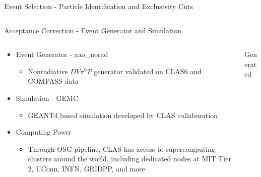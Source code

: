 \documentclass[aspectratio=169]{beamer}
\begin{document}
\begin{frame}{Event Selection - Particle Identification and Exclusivity Cuts}
\begin{columns}[c]
\begin{column}{0.65\textwidth}
\begin{columns}[t, onlytextwidth]
                	


        \end{columns}
        \end{column}   
        \end{columns}
\end{frame}


\begin{frame}{Acceptance Correction - Event Generator and Simulation}
     \begin{columns}[c]
               \begin{column}{0.5\textwidth}

                    \begin{itemize}
                        \item Event Generator - aao\_norad
                            \begin{itemize}
                                \item Nonradiative $DV\pi^0P$ generator validated on CLAS6 and COMPASS data
                            \end{itemize}
                        \item Simulation - GEMC
                            \begin{itemize}
                                \item GEANT4 based simulation developed by CLAS collaboration
                            \end{itemize}
                        \item Computing Power
                            \begin{itemize}
                                \item Through OSG pipeline, CLAS has access to supercomputing clusters around the world, including dedicated nodes at MIT Tier 2, UConn, INFN, GRIDPP, and more
                            \end{itemize}
                    \end{itemize}
                    \end{column}
                    
                    
    \begin{column}{0.5\textwidth}
                
                \centering Generated \\
        \begin{columns}
                    

\end{columns}
\end{column}
\end{columns}
\end{frame}
\end{document}
